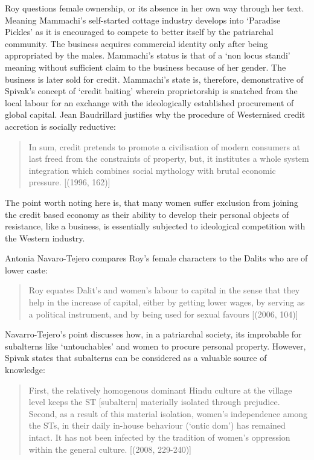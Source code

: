 Roy questions female ownership, or its absence in her own way through her text. Meaning Mammachi’s self-started cottage industry develops into ‘Paradise Pickles’ as it is encouraged to compete to better itself by the patriarchal community. The business acquires commercial identity only after being appropriated by the males. Mammachi’s status is that of a ‘non locus standi’ meaning without sufficient claim to the business because of her gender. The business is later sold for credit. Mammachi’s state is, therefore, demonstrative of Spivak’s concept of ‘credit baiting’ wherein proprietorship is snatched from the local labour for an exchange with the ideologically established procurement of global capital. Jean Baudrillard justifies why the procedure of Westernised credit accretion is socially reductive:

\begin{quote}
  In sum, credit pretends to promote a civilisation of modern consumers at last freed from the constraints of property, but, it institutes a whole system integration which combines social mythology with brutal economic pressure. [(1996, 162)]
\end{quote}

The point worth noting here is, that many women suffer exclusion from joining the credit based economy as their ability to develop their personal objects of resistance, like a business, is essentially subjected to ideological competition with the Western industry. 

Antonia Navaro-Tejero compares Roy’s female characters to the Dalits who are of lower caste:

\begin{quote}
  Roy equates Dalit’s and women’s labour to capital in the sense that they help in the increase of capital, either by getting lower wages, by serving as a political instrument, and by being used for sexual favours [(2006, 104)]
\end{quote}

Navarro-Tejero’s point discusses how, in a patriarchal society, its improbable for subalterns like ‘untouchables’ and women to procure personal property. However, Spivak states that subalterns can be considered as a valuable source of knowledge: 
\begin{quote}
  First, the relatively homogenous dominant Hindu culture at the village level keeps the ST [subaltern] materially isolated through prejudice. Second, as a result of this material isolation, women’s independence among the STs, in their daily in-house behaviour (‘ontic dom’) has remained intact. It has not been infected by the tradition of women’s oppression within the general culture. [(2008, 229-240)]
\end{quote}

